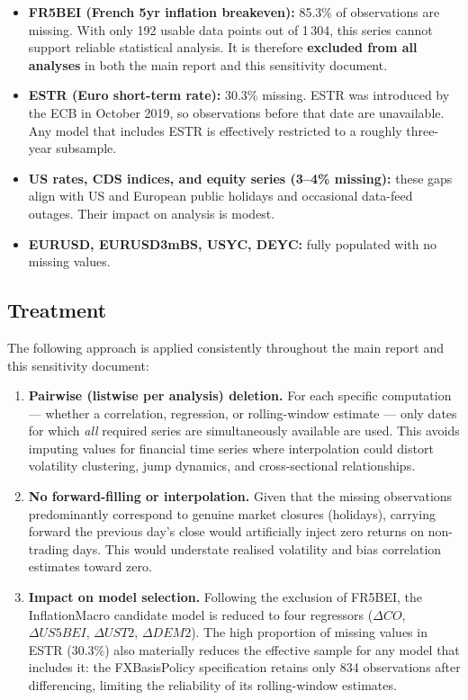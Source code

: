 \begin{itemize}
  \item \textbf{FR5BEI (French 5yr inflation breakeven):} 85.3\% of
    observations are missing. With only 192 usable data points out of 1\,304,
    this series cannot support reliable statistical analysis. It is therefore
    \textbf{excluded from all analyses} in both the main report and this
    sensitivity document.
  \item \textbf{ESTR (Euro short-term rate):} 30.3\% missing. ESTR was
    introduced by the ECB in October 2019, so observations before that date are
    unavailable. Any model that includes ESTR is effectively restricted to a
    roughly three-year subsample.
  \item \textbf{US rates, CDS indices, and equity series (3--4\% missing):}
    these gaps align with US and European public holidays and occasional
    data-feed outages. Their impact on analysis is modest.
  \item \textbf{EURUSD, EURUSD3mBS, USYC, DEYC:} fully populated with no
    missing values.
\end{itemize}

\subsection*{Treatment}

The following approach is applied consistently throughout the main report and
this sensitivity document:

\begin{enumerate}
  \item \textbf{Pairwise (listwise per analysis) deletion.} For each specific
    computation --- whether a correlation, regression, or rolling-window
    estimate --- only dates for which \emph{all} required series are
    simultaneously available are used. This avoids imputing values for
    financial time series where interpolation could distort volatility
    clustering, jump dynamics, and cross-sectional relationships.

  \item \textbf{No forward-filling or interpolation.} Given that the missing
    observations predominantly correspond to genuine market closures (holidays),
    carrying forward the previous day's close would artificially inject zero
    returns on non-trading days. This would understate realised volatility and
    bias correlation estimates toward zero.

  \item \textbf{Impact on model selection.} Following the exclusion of FR5BEI,
    the InflationMacro candidate model is reduced to four regressors (\(\Delta
    CO\), \(\Delta US5BEI\), \(\Delta UST2\), \(\Delta DEM2\)). The high
    proportion of missing values in ESTR (30.3\%) also materially reduces the
    effective sample for any model that includes it: the FXBasisPolicy
    specification retains only 834 observations after differencing, limiting
    the reliability of its rolling-window estimates.
\end{enumerate}
